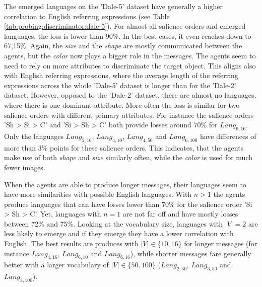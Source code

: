 The emerged languages on the 'Dale-5' dataset have generally a higher correlation to English referring expressions (see Table \ref{tab:probing:discriminator:dale-5}).
For almost all salience orders and emerged languages, the loss is lower than 90\%.
In the best cases, it even reaches down to 67,15\%.
Again, the \emph{size} and the \emph{shape} are mostly communicated between the agents, but the \emph{color} now plays a bigger role in the messages.
The agents seem to need to rely on more attributes to discriminate the target object.
This aligns also with English referring expressions, where the average length of the referring expressions across the whole 'Dale-5' dataset is longer than for the 'Dale-2' dataset.
However, opposed to the 'Dale-2' dataset, there are almost no languages, where there is one dominant attribute.
More often the loss is similar for two salience orders with different primary attributes.
For instance the salience orders 'Sh > Si > C' and 'Si > Sh > C' both provide losses around 70\% for $Lang_{6,16}$.
Only the languages $Lang_{2,16}$, $Lang_{4,10}$, $Lang_{4,50}$ and $Lang_{6,100}$ have differences of more than 3\% points for these salience orders.
This indicates, that the agents make use of both \emph{shape} and \emph{size} similarly often, while the \emph{color} is used for much fewer images.

When the agents are able to produce longer messages, their languages seem to have more similarities with possible English languages.
With $n>1$ the agents produce languages that can have losses lower than 70\% for the salience order 'Si > Sh > C'.
Yet, languages with $n=1$ are not far off and have mostly losses between 72\% and 75\%.
Looking at the vocabulary size, languages with $|V|=2$ are less likely to emerge and if they emerge they have a lower correlation with English.
The best results are produces with $|V| \in \{10,16\}$ for longer messages (for instance $Lang_{4,16}$, $Lang_{6,10}$ and $Lang_{6,16}$), while shorter messages fare generally better with a larger vocabulary of $|V| \in \{50,100\}$ ($Lang_{2,50}$, $Lang_{3,50}$ and $Lang_{3,100}$).

